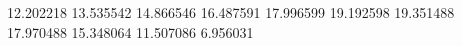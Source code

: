12.202218
13.535542
14.866546
16.487591
17.996599
19.192598
19.351488
17.970488
15.348064
11.507086
6.956031
